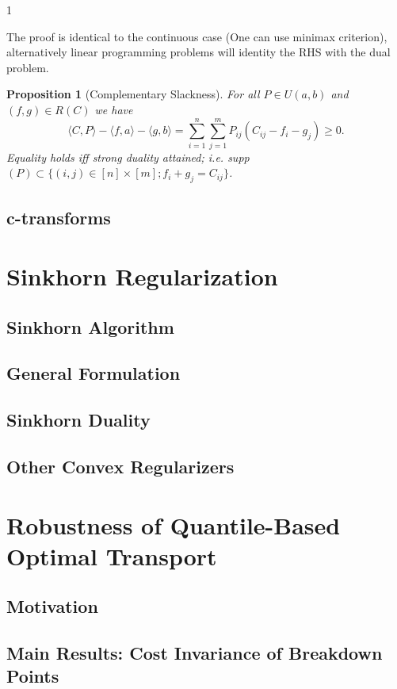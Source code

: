 \documentclass[12pt]{article}
\newtheorem{proposition}[theorem]{Proposition}
\theoremstyle{definition}
\theoremstyle{plain}
\begin{document}
\begin{spacing}{1}
{The proof is identical to the continuous case (One can use minimax criterion), alternatively linear programming problems will identity the RHS with the dual problem.

\begin{proposition}[Complementary Slackness]
    For all $P \in U(a, b)$ and $(f, g) \in R(C)$ we have
    \[
    \langle C, P \rangle - \langle f, a \rangle - \langle g, b \rangle = \sum_{i = 1}^n \sum_{j = 1}^m P_{ij} (C_{ij} - f_i - g_j) \geq 0.
    \]
    Equality holds iff strong duality attained; i.e. supp$(P) \subset \{(i, j) \in [n] \times [m]; f_i + g_j = C_{ij}\}$.
\end{proposition}

\subsection{c-transforms}

\newpage
\section{Sinkhorn Regularization}
\subsection{Sinkhorn Algorithm}

\newpage
\subsection{General Formulation}

\newpage
\subsection{Sinkhorn Duality}

\newpage
\subsection{Other Convex Regularizers}

\newpage
\section{Robustness of Quantile-Based Optimal Transport}
\subsection{Motivation}

\newpage
\subsection{Main Results: Cost Invariance of Breakdown Points}

}
\end{spacing}
\end{document}
